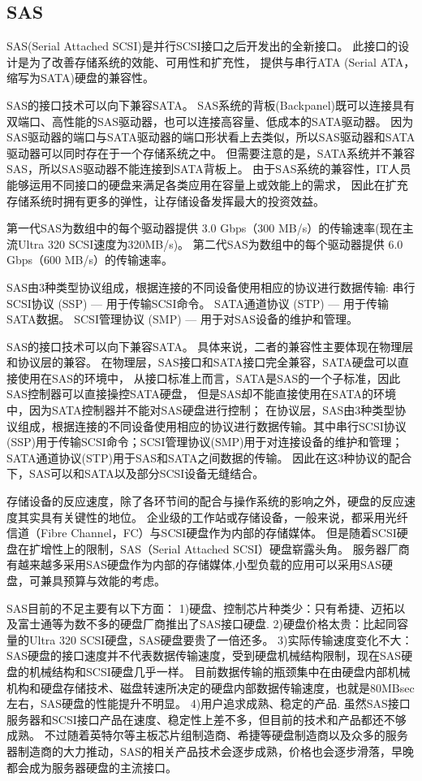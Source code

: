\subsection{SAS}

SAS(Serial Attached SCSI)是并行SCSI接口之后开发出的全新接口。
此接口的设计是为了改善存储系统的效能、可用性和扩充性，
提供与串行ATA (Serial ATA，缩写为SATA)硬盘的兼容性。

SAS的接口技术可以向下兼容SATA。
SAS系统的背板(Backpanel)既可以连接具有双端口、高性能的SAS驱动器，也可以连接高容量、低成本的SATA驱动器。
因为SAS驱动器的端口与SATA驱动器的端口形状看上去类似，所以SAS驱动器和SATA驱动器可以同时存在于一个存储系统之中。
但需要注意的是，SATA系统并不兼容SAS，所以SAS驱动器不能连接到SATA背板上。
由于SAS系统的兼容性，IT人员能够运用不同接口的硬盘来满足各类应用在容量上或效能上的需求，
因此在扩充存储系统时拥有更多的弹性，让存储设备发挥最大的投资效益。


第一代SAS为数组中的每个驱动器提供 3.0 Gbps（300 MB/s）的传输速率(现在主流Ultra 320 SCSI速度为320MB/s)。
第二代SAS为数组中的每个驱动器提供 6.0 Gbps（600 MB/s）的传输速率。

SAS由3种类型协议组成，根据连接的不同设备使用相应的协议进行数据传输:
串行SCSI协议 (SSP) — 用于传输SCSI命令。
SATA通道协议 (STP) — 用于传输SATA数据。
SCSI管理协议 (SMP) — 用于对SAS设备的维护和管理。

SAS的接口技术可以向下兼容SATA。
具体来说，二者的兼容性主要体现在物理层和协议层的兼容。
在物理层，SAS接口和SATA接口完全兼容，SATA硬盘可以直接使用在SAS的环境中，
从接口标准上而言，SATA是SAS的一个子标准，因此SAS控制器可以直接操控SATA硬盘，
但是SAS却不能直接使用在SATA的环境中，因为SATA控制器并不能对SAS硬盘进行控制；
在协议层，SAS由3种类型协议组成，根据连接的不同设备使用相应的协议进行数据传输。其中串行SCSI协议(SSP)用于传输SCSI命令；SCSI管理协议(SMP)用于对连接设备的维护和管理；
SATA通道协议(STP)用于SAS和SATA之间数据的传输。
因此在这3种协议的配合下，SAS可以和SATA以及部分SCSI设备无缝结合。

存储设备的反应速度，除了各环节间的配合与操作系统的影响之外，硬盘的反应速度其实具有关键性的地位。
企业级的工作站或存储设备，一般来说，都采用光纤信道（Fibre Channel，FC）与SCSI硬盘作为内部的存储媒体。
但是随着SCSI硬盘在扩增性上的限制，SAS（Serial Attached SCSI）硬盘崭露头角。
服务器厂商有越来越多采用SAS硬盘作为内部的存储媒体,小型负载的应用可以采用SAS硬盘，可兼具预算与效能的考虑。


SAS目前的不足主要有以下方面：
1)硬盘、控制芯片种类少：只有希捷、迈拓以及富士通等为数不多的硬盘厂商推出了SAS接口硬盘.
2)硬盘价格太贵：比起同容量的Ultra 320 SCSI硬盘，SAS硬盘要贵了一倍还多。
3)实际传输速度变化不大：SAS硬盘的接口速度并不代表数据传输速度，受到硬盘机械结构限制，现在SAS硬盘的机械结构和SCSI硬盘几乎一样。
目前数据传输的瓶颈集中在由硬盘内部机械机构和硬盘存储技术、磁盘转速所决定的硬盘内部数据传输速度，也就是80MBsec左右，SAS硬盘的性能提升不明显。
4)用户追求成熟、稳定的产品. 虽然SAS接口服务器和SCSI接口产品在速度、稳定性上差不多，但目前的技术和产品都还不够成熟。
不过随着英特尔等主板芯片组制造商、希捷等硬盘制造商以及众多的服务器制造商的大力推动，SAS的相关产品技术会逐步成熟，价格也会逐步滑落，早晚都会成为服务器硬盘的主流接口。

